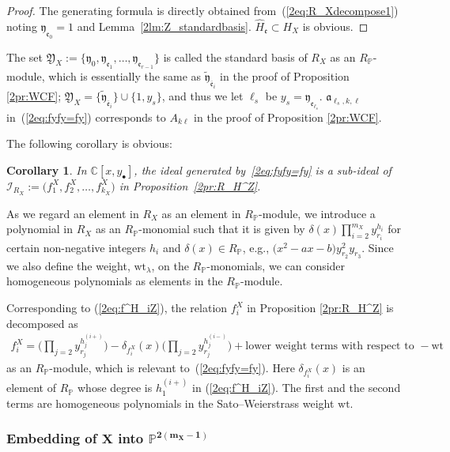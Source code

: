 \documentclass[pdftex]{sigma}
\def\CC{{\mathbb C}}
\def\PP{{\mathbb P}}
\def\cI{{\mathcal I}}
\def\fY{{\mathfrak Y}}
\def\fa{{\mathfrak a}}
\def\fe{{\mathfrak e}}
\def\fy{{\mathfrak y}}
\def\tfy{{\widetilde{\mathfrak y}}}
\def\Bfe{{\overline{\mathfrak e}}}
\def\hH{{\widehat H}}
\def\wt{{\mathrm {wt}}}
\numberwithin{equation}{section}
\newtheorem{Corollary}[Theorem]{Corollary}
\begin{document}
\begin{proof}The generating formula is directly obtained from~(\ref{2eq:R_Xdecompose1}) noting $\fy_{\fe_0}=1$ and Lemma~\ref{2lm:Z_standardbasis}.
 $\hH_{\fe}\subset H_X$ is obvious.
\end{proof}

The set $\fY_X:=\{\fy_{0}, \fy_{\fe_1}, \dots, \fy_{\fe_{r-1}}\}$ is called the standard basis of $R_X$ as an $R_\PP$-module, which is essentially the same as $\tfy_{\Bfe_i}$ in the proof of Proposition \ref{2pr:WCF}; $\fY_X=\{\tfy_{\Bfe_i}\}\cup\{1,y_s\}$, and thus we let $\ell_s$ be $y_s=\fy_{\fe_{\ell_s}}$.
$\fa_{\ell_s,k,\ell}$ in~(\ref{2eq:fyfy=fy}) corresponds to $A_{k\ell}$ in the proof of Proposition \ref{2pr:WCF}.

The following corollary is obvious:
\begin{Corollary}\label{2cr:Ideal_fyfy}
In $\CC[x, y_\bullet]$, the ideal generated by~\eqref{2eq:fyfy=fy} is a sub-ideal of $\cI_{R_X}:=\big(f_1^X, f_2^X, \dots,\allowbreak f_{k_X}^X\big)$ in Proposition~{\rm \ref{2pr:R_H^Z}}.
\end{Corollary}

As we regard an element in $R_X$ as an element in $R_\PP$-module, we introduce a polynomial in $R_X$ as an $R_\PP$-monomial such that it is given by $\delta(x) \prod_{i=2}^{m_X} y_{r_i}^{h_i}$ for certain non-negative integers $h_i$ and $\delta(x)\in R_\PP$, e.g., $\big(x^2-a x-b\big) y_{r_2}^2 y_{r_3}$.
Since we also define the weight, $\wt_\lambda$, on the $R_\PP$-monomials, we can consider homogeneous polynomials as elements in the $R_\PP$-module.

\begin{Remark}\label{2rk:RP-moduleRX}
Corresponding to (\ref{2eq:f^H_iZ}), the relation $f^X_i$ in Proposition \ref{2pr:R_H^Z} is decomposed as
\begin{gather*}
f^X_i =
\bigg(
\prod_{j=2} y_{r_j}^{h_j^{(i+)}}
\bigg)
-\delta_{f^X_i}(x)\bigg(
\prod_{j=2} y_{r_j}^{h_j^{(i-)}}
\bigg)+ \text{lower weight terms with respect to }{-}\wt
\end{gather*}
as an $R_\PP$-module, which is relevant to~(\ref{2eq:fyfy=fy}).
Here $\delta_{f^X_i}(x)$ is an element of $R_\PP$ whose degree is $h_1^{(i+)}$ in (\ref{2eq:f^H_iZ}).
The first and the second terms are homogeneous polynomials in the Sato--Weierstrass weight $\wt$.
\end{Remark}

\subsubsection[Embedding of X into P\^{}\{2(m\_X-1)\}]{Embedding of $\boldsymbol{X}$ into $\boldsymbol{\PP^{2(m_X-1)}}$}\label{2sssc:X_to_PP^m}
\end{document}
